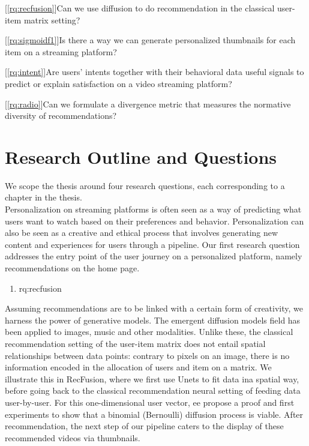 
[\ref{rq:recfusion}]{Can we use diffusion to do recommendation in the classical user-item matrix setting?}

[\ref{rq:sigmoidf1}]{Is there a way we can generate personalized thumbnails for each item on a streaming platform?}

[\ref{rq:intent}]{Are users' intents together with their behavioral data useful signals to predict or explain satisfaction on a video streaming platform?}

[\ref{rq:radio}]{Can we formulate a divergence metric that measures the normative diversity of recommendations?}

\section{Research Outline and Questions}
\label{section:introduction:rqs}


We scope the thesis around four research questions, each corresponding to a chapter in the thesis.\\


Personalization on streaming platforms is often seen as a way of predicting what users want to watch based on their preferences and behavior. Personalization can also be seen as a creative and ethical process that involves generating new content and experiences for users through a pipeline. Our first research question addresses the entry point of the user journey on a personalized platform, namely recommendations on the home page.


\begin{enumerate}[label=\textbf{RQ\arabic*},ref={RQ\arabic*},resume,leftmargin=*]
	\item \acl{rq:recfusion}\label{rq:recfusion}
\end{enumerate}

Assuming recommendations are to be linked with a certain form of creativity, we harness the power of generative models. The emergent diffusion models field has been applied to images, music and other modalities. Unlike these, the classical recommendation setting of the user-item matrix does not entail spatial relationships between data points: contrary to pixels on an image, there is no information encoded in the allocation of users and item on a matrix. We illustrate this in RecFusion, where we first use Unets to fit data ina spatial way, before going back to the classical recommendation neural setting of feeding data user-by-user. For this one-dimensional user vector, ee propose a proof and first experiments to show that a binomial (Bernoulli) diffusion process is viable. After recommendation, the next step of our pipeline caters to the display of these recommended videos via thumbnails.

